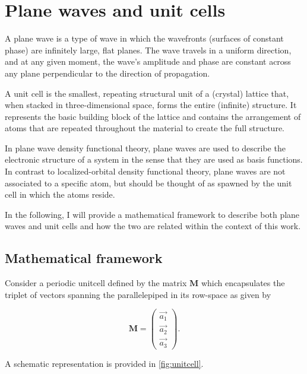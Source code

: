 %
%
%
\section{Plane waves and unit cells}

A plane wave is a type of wave in which the wavefronts (surfaces of constant phase) are infinitely large, flat planes. The wave travels in a uniform direction, and at any given moment, the wave's amplitude and phase are constant across any plane perpendicular to the direction of propagation. 

A unit cell is the smallest, repeating structural unit of a (crystal) lattice that, when stacked in three-dimensional space, forms the entire (infinite) structure. It represents the basic building block of the lattice and contains the arrangement of atoms that are repeated throughout the material to create the full structure.

In plane wave density functional theory, plane waves are used to describe the electronic structure of a system in the sense that they are used as basis functions. In contrast to localized-orbital density functional theory, plane waves are not associated to a specific atom, but should be thought of as spawned by the unit cell in which the atoms reside.

In the following, I will provide a mathematical framework to describe both plane waves and unit cells and how the two are related within the context of this work.

%
%
%
\subsection{Mathematical framework}

Consider a periodic unitcell defined by the matrix $\mathbf{M}$ which encapsulates the triplet of vectors spanning the parallelepiped in its row-space as given by

\begin{equation}
    \mathbf{M} = \left(
    \begin{matrix}
        \vec{a_{1}}\\
        \vec{a_{2}}\\
        \vec{a_{3}}
    \end{matrix}
    \right).
\end{equation}

A schematic representation is provided in \cref{fig:unitcell}.

\begin{Figure}
    \centering
    \resizebox{0.7 \textwidth}{!}{
        
    }
    \label{fig:unitcell}
\end{Figure}

